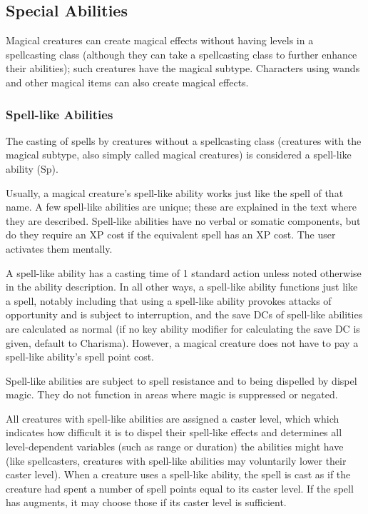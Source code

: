 \subsection{Special Abilities}
Magical creatures can create magical effects without having levels in a spellcasting class 
(although they can take a spellcasting class to further enhance their abilities); such creatures have the magical subtype.
Characters using wands and other magical items can also create magical effects.

\subsubsection{Spell-like Abilities} 
The casting of spells by creatures without a spellcasting class (creatures with the magical subtype, 
also simply called magical creatures) is considered a spell-like ability (Sp). 

Usually, a magical creature's spell-like ability works just like the spell of that name. 
A few spell-like abilities are unique; these are explained in the text where they are described.
Spell-like abilities have no verbal or somatic components, but do they require an XP cost if the equivalent spell has an XP cost. 
The user activates them mentally.

A spell-like ability has a casting time of 1 standard action unless noted otherwise in the ability description. 
In all other ways, a spell-like ability functions just like a spell, notably including that using a spell-like ability provokes attacks of opportunity and is subject to interruption, and the save DCs of spell-like abilities are calculated as normal (if no key ability modifier for calculating the save DC is given, default to Charisma). 
However, a magical creature does not have to pay a spell-like ability's spell point cost.

Spell-like abilities are subject to spell resistance and to being dispelled by dispel magic. 
They do not function in areas where magic is suppressed or negated.

All creatures with spell-like abilities are assigned a caster level, which which indicates how difficult it is to dispel their spell-like effects and determines all level-dependent variables (such as range or duration) the abilities might have (like spellcasters, creatures with spell-like abilities may voluntarily lower their caster level). 
When a creature uses a spell-like ability, the spell is cast as if the creature had spent a number of spell points equal to its caster level.
If the spell has augments, it may choose those if its caster level is sufficient.
